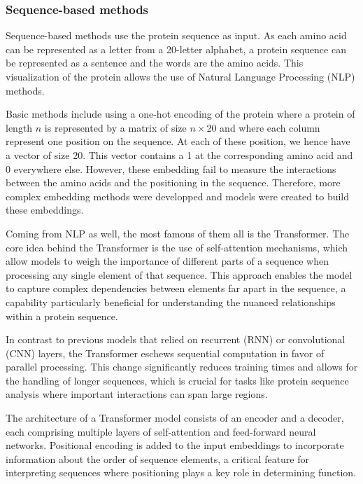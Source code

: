 \subsubsection{Sequence-based methods}

Sequence-based methods use the protein sequence as input. \cite{WU202118,ijms222111741} As each amino acid can be represented as a letter from a 20-letter alphabet, a protein sequence can be represented as a sentence and the words are the amino acids. This visualization of the protein allows the use of Natural Language Processing (NLP) methods.

Basic methods include using a one-hot encoding of the protein where a protein of length $n$ is represented by a matrix of size $n\times 20$ and where each column represent one position on the sequence. At each of these position, we hence have a vector of size 20. This vector contains a 1 at the corresponding amino acid and 0 everywhere else. \cite{ElAbd2020} However, these embedding fail to measure the interactions between the amino acids and the positioning in the sequence. Therefore, more complex embedding methods were developped and models were created to build these embeddings. 

Coming from NLP as well, the most famous of them all is the Transformer. \cite{NIPS2017_3f5ee243} The core idea behind the Transformer is the use of self-attention mechanisms, which allow models to weigh the importance of different parts of a sequence when processing any single element of that sequence. This approach enables the model to capture complex dependencies between elements far apart in the sequence, a capability particularly beneficial for understanding the nuanced relationships within a protein sequence.

In contrast to previous models that relied on recurrent (RNN) or convolutional (CNN) layers, the Transformer eschews sequential computation in favor of parallel processing. This change significantly reduces training times and allows for the handling of longer sequences, which is crucial for tasks like protein sequence analysis where important interactions can span large regions.

The architecture of a Transformer model consists of an encoder and a decoder, each comprising multiple layers of self-attention and feed-forward neural networks. Positional encoding is added to the input embeddings to incorporate information about the order of sequence elements, a critical feature for interpreting sequences where positioning plays a key role in determining function.

